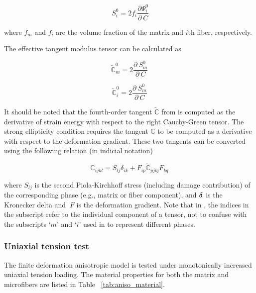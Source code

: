 \documentclass[12pt]{article}
\numberwithin{equation}{section}
\begin{document}
\begin{equation}\label{eq:aniso_S0i}
  ~S_i^0 =
    2 f_i \frac{\partial \Psi_i^0}{\partial~C}
\end{equation}

where $f_m$ and $f_i$ are the volume fraction of the matrix and $i$th fiber, respectively.

The effective tangent modulus tensor can be calculated as

\begin{equation}\label{eq:aniso_tangent1}
  \tilde{\mathbb{C}}_m^0 =
    2 \frac{\partial ~S_m^0}{\partial~C}
\end{equation}

\begin{equation}\label{eq:aniso_tangent2}
  \tilde{\mathbb{C}}_i^0 =
    2 \frac{\partial ~S_m^0}{\partial~C}
\end{equation}

It should be noted that the fourth-order tangent $\tilde{\mathbb{C}}$
from  is computed as the derivative of strain
energy with respect to the right Cauchy-Green tensor. The strong
ellipticity condition  requires the
tangent $\mathbb{C}$ to be computed as a derivative with respect to
the deformation gradient. These two tangents can be converted using
the following relation (in indicial notation)

\begin{equation}\label{eq:aniso_tangent3}
  \mathbb{C}_{ijkl} = S_{lj} \delta_{ik}
    + F_{ip} \tilde{\mathbb{C}}_{pjlq} F_{kq}
\end{equation}

where $S_{lj}$ is the second Piola-Kirchhoff stress (including
damage contribution) of the corresponding phase (e.g., matrix or fiber
component), and ${\boldsymbol{\delta}}$ is the Kronecker delta and $~F$ is the
deformation gradient. Note that in , the
indices in the subscript refer to the individual component of a
tensor, not to confuse with the subscripts `$m$' and `$i$' used in
 to represent different phases.

\subsubsection{Uniaxial tension test}

The finite deformation anisotropic model is tested under monotonically
increased uniaxial tension loading. The material properties for both
the matrix and microfibers are listed in Table~
\ref{tab:aniso_material}.
\end{document}

